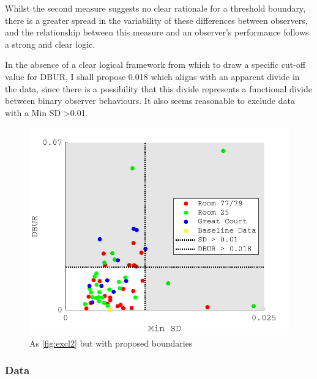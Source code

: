 Whilst the second measure suggests no clear rationale for a threshold boundary, there is a greater spread in the variability of these differences between observers, and the relationship between this measure and an observer’s performance follows a strong and clear logic.

In the absence of a clear logical framework from which to draw a specific cut-off value for DBUR, I shall propose 0.018 which aligns with an apparent divide in the data, since there is a possibility that this divide represents a functional divide between binary observer behaviours. It also seems reasonable to exclude data with a Min SD \textgreater 0.01.

\begin{figure}[hbtp] %
\includegraphics[max width=\textwidth]{figs/tablet/excl3.pdf} 
\caption{As \ref{fig:excl2} but with proposed boundaries}
\label{fig:excl3}
\end{figure}

\subsubsection{Data}

